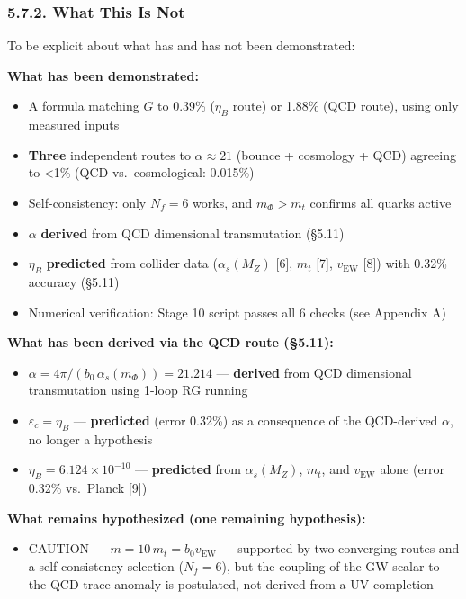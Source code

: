 \documentclass[
  11pt,
]{article}
\providecommand{\tightlist}{%
  \setlength{\itemsep}{0pt}\setlength{\parskip}{0pt}}
\begin{document}
\hypertarget{what-this-is-not}{%
\subsubsection{5.7.2. What This Is Not}\label{what-this-is-not}}

To be explicit about what has and has not been demonstrated:

\textbf{What has been demonstrated:}

\begin{itemize}
\tightlist
\item
  A formula matching \(G\) to 0.39\% (\(\eta_B\) route) or 1.88\% (QCD
  route), using only measured inputs
\item
  \textbf{Three} independent routes to \(\alpha \approx 21\) (bounce +
  cosmology + QCD) agreeing to \textless1\% (QCD vs.~cosmological:
  0.015\%)
\item
  Self-consistency: only \(N_f = 6\) works, and \(m_\Phi > m_t\)
  confirms all quarks active
\item
  \(\alpha\) \textbf{derived} from QCD dimensional transmutation (§5.11)
\item
  \(\eta_B\) \textbf{predicted} from collider data (\(\alpha_s(M_Z)\)
  {[}6{]}, \(m_t\) {[}7{]}, \(v_{\text{EW}}\) {[}8{]}) with 0.32\%
  accuracy (§5.11)
\item
  Numerical verification: Stage 10 script passes all 6 checks (see
  Appendix A)
\end{itemize}

\textbf{What has been derived via the QCD route (§5.11):}

\begin{itemize}
\tightlist
\item
  \(\alpha = 4\pi/(b_0\,\alpha_s(m_\Phi)) = 21.214\) ---
  \textbf{derived} from QCD dimensional transmutation using 1-loop RG
  running
\item
  \(\varepsilon_c = \eta_B\) --- \textbf{predicted} (error 0.32\%) as a
  consequence of the QCD-derived \(\alpha\), no longer a hypothesis
\item
  \(\eta_B = 6.124 \times 10^{-10}\) --- \textbf{predicted} from
  \(\alpha_s(M_Z)\), \(m_t\), and \(v_{\text{EW}}\) alone (error 0.32\%
  vs.~Planck {[}9{]})
\end{itemize}

\textbf{What remains hypothesized (one remaining hypothesis):}

\begin{itemize}
\tightlist
\item
  CAUTION --- \(m = 10\,m_t = b_0 v_{\text{EW}}\) --- supported by two
  converging routes and a self-consistency selection (\(N_f = 6\)), but
  the coupling of the GW scalar to the QCD trace anomaly is postulated,
  not derived from a UV completion
\end{itemize}
\end{document}
